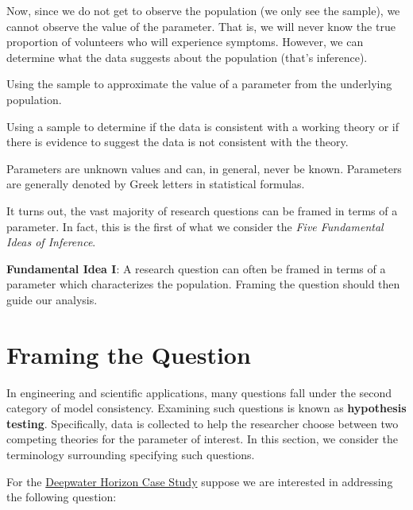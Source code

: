 \documentclass[]{book}
\theoremstyle{definition}
\theoremstyle{definition}
\theoremstyle{definition}
\theoremstyle{remark}
\let\BeginKnitrBlock\begin \let\EndKnitrBlock\end
\begin{document}
Now, since we do not get to observe the population (we only see the
sample), we cannot observe the value of the parameter. That is, we will
never know the true proportion of volunteers who will experience
symptoms. However, we can determine what the data suggests about the
population (that's inference).

\BeginKnitrBlock{definition}[Estimation]
\protect\hypertarget{def:defn-estimation}{}{\label{def:defn-estimation}
{} }Using the sample to approximate the value
of a parameter from the underlying population.
\EndKnitrBlock{definition}

\BeginKnitrBlock{definition}[Hypothesis Testing]
\protect\hypertarget{def:defn-hypothesis-testing}{}{\label{def:defn-hypothesis-testing}
{} }Using a sample to determine if the
data is consistent with a working theory or if there is evidence to
suggest the data is not consistent with the theory.
\EndKnitrBlock{definition}

\BeginKnitrBlock{rmdkeyidea}
Parameters are unknown values and can, in general, never be known.
Parameters are generally denoted by Greek letters in statistical
formulas.
\EndKnitrBlock{rmdkeyidea}

It turns out, the vast majority of research questions can be framed in
terms of a parameter. In fact, this is the first of what we consider the
\emph{Five Fundamental Ideas of Inference}.

\BeginKnitrBlock{rmdfivefund}
\textbf{Fundamental Idea I}: A research question can often be framed in
terms of a parameter which characterizes the population. Framing the
question should then guide our analysis.
\EndKnitrBlock{rmdfivefund}

\section{Framing the Question}\label{framing-the-question}

In engineering and scientific applications, many questions fall under
the second category of model consistency. Examining such questions is
known as \textbf{hypothesis testing}. Specifically, data is collected to
help the researcher choose between two competing theories for the
parameter of interest. In this section, we consider the terminology
surrounding specifying such questions.

For the \protect\hyperlink{CaseDeepwater}{Deepwater Horizon Case Study}
suppose we are interested in addressing the following question:
\end{document}
